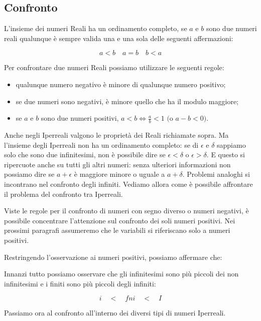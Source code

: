 \subsection{Confronto}
\label{subsec:insnum_confronto}

L'insieme dei numeri Reali ha un ordinamento completo, se $a$ e $b$ sono due 
numeri reali qualunque è sempre valida una e una sola delle seguenti 
affermazioni:

\[a<b \quad a=b \quad b<a\]

Per confrontare due numeri Reali possiamo utilizzare le seguenti regole:

\begin{itemize} [noitemsep]
 \item qualunque numero negativo è minore di qualunque numero positivo;
 \item se due numeri sono negativi, è minore quello che ha il modulo maggiore;
 \item se $a$ e $b$ sono due numeri positivi, 
 $a<b \Leftrightarrow \frac{a}{b}<1 \text{ (o } a-b<0 \text{)}$.
\end{itemize}

Anche negli Iperreali valgono le proprietà dei Reali richiamate sopra. 
Ma l'insieme degli Iperreali non ha un ordinamento completo:
se di $\epsilon$ e $\delta$ sappiamo solo che sono due infinitesimi,
non è possibile dire se $\epsilon < \delta$ o $\epsilon > \delta$.
E questo si ripercuote anche su tutti gli altri numeri: senza ulteriori 
informazioni non possiamo dire se $a+\epsilon$ è maggiore minore o uguale 
a $a+\delta$. 
Problemi analoghi si incontrano nel confronto degli infiniti.
Vediamo allora come è possibile affrontare il problema del confronto tra 
Iperreali.

\begin{osservazione}
Viste le regole per il confronto di numeri con segno diverso o numeri 
negativi, 
è possibile concentrare l'attenzione sul confronto dei soli numeri positivi.
Nei prossimi paragrafi assumeremo che le variabili si riferiscano solo a numeri 
positivi.
\end{osservazione}

Restringendo l'osservazione ai numeri positivi, possiamo affermare che:

Innanzi tutto possiamo osservare che gli infinitesimi sono più piccoli dei non 
infinitesimi e i finiti sono più piccoli degli infiniti:

\[i \quad < \quad fni \quad < \quad I\]

Passiamo ora al confronto all'interno dei diversi tipi di numeri Iperreali.

